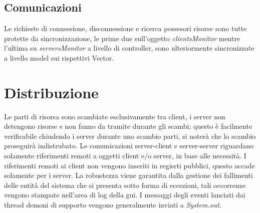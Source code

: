 \documentclass[
10pt, %
a4paper, %
oneside, %
BCOR5mm, %
]{scrartcl}
\begin{document}
	\subsection{Comunicazioni}
	Le richieste di connessione, disconnessione e ricerca possesori risorse sono tutte protette da sincronizzazione, le prime due sull'oggetto \textit{clientsMonitor} mentre l'ultima su \textit{serversMonitor} a livello di controller, sono ulteriormente sincronizzate a livello model sui rispettivi Vector.

\section{Distribuzione}

	Le parti di risorsa sono scambiate esclusivamente tra client, i server non detengono risorse e non fanno da tramite durante gli scambi; questo è facilmente verificabile chiudendo i server durante uno scambio parti, si noterà che lo scambio proseguirà indistrubato. Le comunicazioni server-client e server-server riguardano solamente riferimenti remoti a oggetti client e/o server, in base alle necessità.
	I riferimenti remoti ai client non vengono inseriti in regisrti pubblici, questo accade solamente per i server.
	La robustezza viene garantita dalla gestione dei fallimenti delle entità del sistema che si presenta sotto forma di eccezioni, tali occorrenze vengono stampate nell'area di log della gui. I messaggi degli eventi lanciati dai thread demoni di supporto vengono generalmente inviati a \emph{System.out}.
\end{document}
